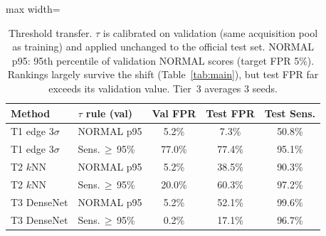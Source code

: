 \begin{table}[t]
\centering
\footnotesize
\setlength{\tabcolsep}{3.5pt}
\begin{adjustbox}{max width=\columnwidth}
\begin{tabular}{llccc}
\toprule
Method & $\tau$ rule (val) & Val FPR & Test FPR & Test Sens. \\
\midrule
T1 edge $3\sigma$ & NORMAL p95 & 5.2\% & 7.3\% & 50.8\% \\
T1 edge $3\sigma$ & Sens.\,$\geq$\,95\% & 77.0\% & 77.4\% & 95.1\% \\
\midrule
T2 $k$NN & NORMAL p95 & 5.2\% & 38.5\% & 90.3\% \\
T2 $k$NN & Sens.\,$\geq$\,95\% & 20.0\% & 60.3\% & 97.2\% \\
\midrule
T3 DenseNet & NORMAL p95 & 5.2\% & 52.1\% & 99.6\% \\
T3 DenseNet & Sens.\,$\geq$\,95\% & 0.2\% & 17.1\% & 96.7\% \\
\bottomrule
\end{tabular}
\end{adjustbox}
\caption{Threshold transfer. $\tau$ is calibrated on validation (same acquisition pool as training) and applied unchanged to the official test set. NORMAL p95: 95th percentile of validation NORMAL scores (target FPR 5\%). Rankings largely survive the shift (Table~\ref{tab:main}), but test FPR far exceeds its validation value. Tier~3 averages 3 seeds.}
\label{tab:tau-transfer}
\end{table}
